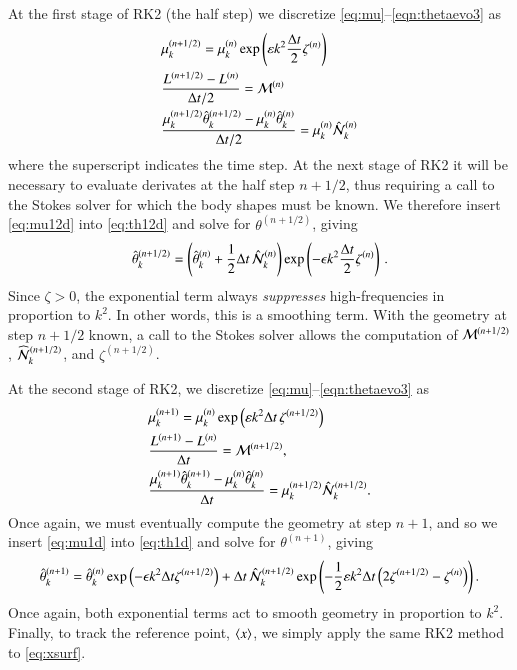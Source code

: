 \documentclass[preprint, 10pt]{elsarticle}
\begin{document}
At the first stage of RK2 (the half step) we discretize \eqref{eq:mu}--\eqref{eqn:thetaevo3} as
\begin{align}
\label{eq:mu12d}
& \mu_k^{(n+1/2)} = \mu_k^{(n)} \exp \left( \varepsilon k^2 \frac{\Delta t}{2} \zeta^{(n)} \right) \\
\label{eq:L12d}
& \frac{L^{(n+1/2)} - L^{(n)}}{\Delta t/2} = \mathcal{M}^{(n)} \\
\label{eq:th12d}
& \frac{ \mu_k^{(n+1/2)} \hat{\theta}_k^{(n+1/2)} - \mu_k^{(n)} \hat{\theta}_k^{(n)}}{\Delta t/2} 
= \mu_k^{(n)} \hat{\mathcal{N}}_k^{(n)}
\end{align}
where the superscript indicates the time step. At the next stage of RK2 it will be necessary to evaluate derivates at the half step $n+1/2$, thus requiring a call to the Stokes solver for which the body shapes must be known. We therefore insert \eqref{eq:mu12d} into \eqref{eq:th12d} and solve for $\theta^{(n+1/2)}$, giving
\begin{align}
\label{eq:th12}
\hat{\theta}_k^{(n+1/2)} = \left( \hat{\theta}_k^{(n)} + \frac{1}{2} \Delta t \, \hat{\mathcal{N}}_k^{(n)} \right)
\exp \left( -\epsilon k^2 \frac{\Delta t}{2} \zeta^{(n)}\right) \, .
\end{align}
Since $\zeta >0$, the exponential term always {\em suppresses} high-frequencies in proportion to $k^2$. In other words, this is a smoothing term. With the geometry at step $n+1/2$ known, a call to the Stokes solver allows the computation of $\mathcal{M}^{(n+1/2)}$, $\widehat{\NLterm}_k^{(n+1/2)}$, and $\zeta^{(n+1/2)}$.

At the second stage of RK2, we discretize \eqref{eq:mu}--\eqref{eqn:thetaevo3} as 
\begin{align}
\label{eq:mu1d}
& \mu_k^{(n+1)} = \mu_k^{(n)} \exp \left( \varepsilon k^2 {\Delta t} \, \zeta^{(n+1/2)} \right) \\
\label{eq:L1d}
& \frac{L^{(n+1)} - L^{(n)}}{\Delta t} = \mathcal{M}^{(n+1/2)}, \\
\label{eq:th1d}
& \frac{ \mu_k^{(n+1)} \hat{\theta}_k^{(n+1)} - \mu_k^{(n)} \hat{\theta}_k^{(n)}}{\Delta t} =
\mu_k^{(n+1/2)} \hat{\mathcal{N}}_k^{(n+1/2)}.
\end{align}
Once again, we must eventually compute the geometry at step $n+1$, and so we insert \eqref{eq:mu1d} into \eqref{eq:th1d} and solve for $\theta^{(n+1)}$, giving
\begin{align}
\hat{\theta}_k^{(n+1)} =  \hat{\theta}_k^{(n)} \exp \left( - \epsilon k^2 \Delta t \zeta^{(n+1/2)} \right) + \Delta t \, \hat{\mathcal{N}}_k^{(n+1/2)} \exp \left( - \frac{1}{2} \varepsilon k^2 \Delta t \left( 2 \zeta^{(n+1/2)} - \zeta^{(n)} \right) \right).
\end{align}
Once again, both exponential terms act to smooth geometry in proportion to $k^2$. Finally, to track the reference point, $\left< x \right>$, we simply apply the same RK2 method to \eqref{eq:xsurf}.
\end{document}
